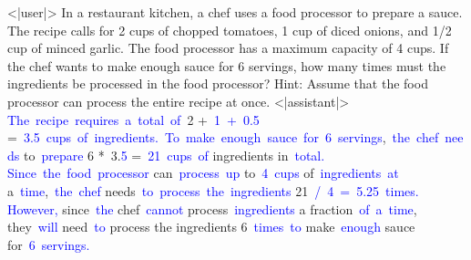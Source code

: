 \documentclass{article}
\begin{document}
\begin{tcolorbox}[colframe=black,colback=white]
<|user|>
In a restaurant kitchen, a chef uses a food processor to prepare a sauce. The recipe calls for 2 cups of chopped tomatoes, 1 cup of diced onions, and 1/2 cup of minced garlic. The food processor has a maximum capacity of 4 cups. If the chef wants to make enough sauce for 6 servings, how many times must the ingredients be processed in the food processor? 
Hint: Assume that the food processor can process the entire recipe at once.
<|assistant|>
\textcolor{blue}{The}\textcolor{blue}{~recipe}\textcolor{blue}{~requires}\textcolor{blue}{~a}\textcolor{blue}{~total}\textcolor{blue}{~of}\textcolor{blue}{~}2 +\textcolor{blue}{~}\textcolor{blue}{1}\textcolor{blue}{~+}\textcolor{blue}{~}\textcolor{blue}{0}\textcolor{blue}{.}\textcolor{blue}{5} =\textcolor{blue}{~}\textcolor{blue}{3}\textcolor{blue}{.}\textcolor{blue}{5}\textcolor{blue}{~cups}\textcolor{blue}{~of}\textcolor{blue}{~ingredients}\textcolor{blue}{.}\textcolor{blue}{~To}\textcolor{blue}{~make}\textcolor{blue}{~enough}\textcolor{blue}{~sauce}\textcolor{blue}{~for}\textcolor{blue}{~}\textcolor{blue}{6}\textcolor{blue}{~servings},\textcolor{blue}{~the}\textcolor{blue}{~chef}\textcolor{blue}{~needs} to\textcolor{blue}{~prepare} 6 *\textcolor{blue}{~}3.\textcolor{blue}{5} =\textcolor{blue}{~}\textcolor{blue}{21}\textcolor{blue}{~cups}\textcolor{blue}{~of} ingredients in\textcolor{blue}{~total}\textcolor{blue}{.}\textcolor{blue}{~
}\textcolor{blue}{Since}\textcolor{blue}{~the}\textcolor{blue}{~food}\textcolor{blue}{~processor} can\textcolor{blue}{~process}\textcolor{blue}{~up} to\textcolor{blue}{~}\textcolor{blue}{4}\textcolor{blue}{~cups} of\textcolor{blue}{~ingredients}\textcolor{blue}{~at} a\textcolor{blue}{~time},\textcolor{blue}{~the}\textcolor{blue}{~chef} needs\textcolor{blue}{~to}\textcolor{blue}{~process}\textcolor{blue}{~the}\textcolor{blue}{~ingredients} 21\textcolor{blue}{~/}\textcolor{blue}{~}\textcolor{blue}{4}\textcolor{blue}{~=}\textcolor{blue}{~}\textcolor{blue}{5}\textcolor{blue}{.}\textcolor{blue}{25}\textcolor{blue}{~times}\textcolor{blue}{.} 
\textcolor{blue}{However}\textcolor{blue}{,} since\textcolor{blue}{~the} chef\textcolor{blue}{~cannot} process\textcolor{blue}{~ingredients} a fraction\textcolor{blue}{~of}\textcolor{blue}{~a}\textcolor{blue}{~time}, they\textcolor{blue}{~will} need\textcolor{blue}{~to} process the ingredients 6\textcolor{blue}{~times}\textcolor{blue}{~to} make\textcolor{blue}{~enough} sauce for\textcolor{blue}{~}\textcolor{blue}{6}\textcolor{blue}{~servings}\textcolor{blue}{.}\textcolor{blue}{}
\end{tcolorbox}
\end{document}
